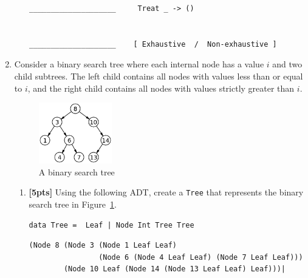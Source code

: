 \documentclass[paper=letter, fontsize=13pt]{article} %
\numberwithin{equation}{section} %
\newif\ifshowanswers\showanswerstrue
\begin{document}
\begin{enumerate}
\begin{enumerate}
\begin{lstlisting}
____________________     Treat _ -> ()


____________________    [ Exhaustive  /  Non-exhaustive ]
\end{lstlisting}

\end{enumerate}

\newpage
\item Consider a binary search tree where each internal node has a value $i$ and two child subtrees.  
The left child contains all nodes with values less than or equal to $i$, and the
right child contains all nodes with values strictly greater than $i$.  

\begin{figure}[h]
  \begin{center}
\includegraphics[width=0.3\textwidth]{bst}
\caption{A binary search tree}
\label{fig:bst}
\end{center}
\end{figure}

\begin{enumerate}[label=(\Alph*)]
  \item \textbf{[5pts]} Using the following ADT, create a \texttt{Tree} that represents the binary search tree in Figure~\ref{fig:bst}.
\begin{lstlisting}
data Tree =  Leaf | Node Int Tree Tree
\end{lstlisting}
    \ifshowanswers 
\begin{verbatim}
(Node 8 (Node 3 (Node 1 Leaf Leaf) 
                (Node 6 (Node 4 Leaf Leaf) (Node 7 Leaf Leaf))) 
        (Node 10 Leaf (Node 14 (Node 13 Leaf Leaf) Leaf)))| 
\end{verbatim}
    \else
     \bigskip
     \bigskip
     \bigskip 
     \bigskip
     \bigskip 
     \bigskip
     \bigskip
     \bigskip 
     \bigskip
     \bigskip
    \fi
 

\end{enumerate}
\end{enumerate}
\end{document}
